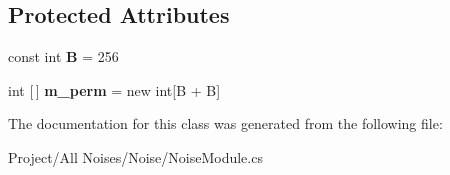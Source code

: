 \subsection*{Protected Attributes}
\begin{DoxyCompactItemize}
\item 
\mbox{\label{class_noise_module_a2dba0071f6e03f54d2cf67d71d978955}} 
const int {\bfseries B} = 256
\item 
\mbox{\label{class_noise_module_a3022dc862ba96b45e5ddcb7bcd2ddc09}} 
int \mbox{[}$\,$\mbox{]} {\bfseries m\+\_\+perm} = new int\mbox{[}B + B\mbox{]}
\end{DoxyCompactItemize}


The documentation for this class was generated from the following file\+:\begin{DoxyCompactItemize}
\item 
Project/\+All Noises/\+Noise/Noise\+Module.\+cs\end{DoxyCompactItemize}
